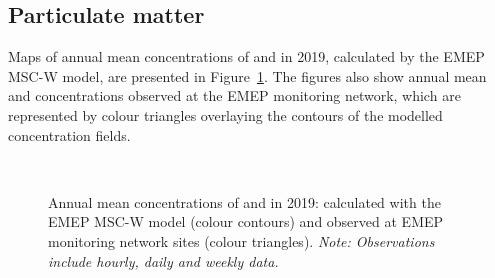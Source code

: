 \subsection{Particulate matter} 
\label{subs:PMstatus}

Maps of annual mean concentrations of \PM[10] and \PM[2.5] in 2019,
calculated by the EMEP MSC-W model, are presented in
Figure~\ref{fig:PMin2019}. The figures also show annual mean \PM[10]
and \PM[2.5] concentrations observed at the EMEP monitoring network,
which are represented by colour triangles overlaying the contours of the
modelled concentration fields.

\begin{figure}[H]
  \\
  \vspace{0.5cm}
\caption{Annual mean concentrations of \PM[10] and \PM[2.5] in 2019:
  calculated with the EMEP MSC-W model (colour contours) and observed
  at EMEP monitoring network sites (colour triangles). \textit{Note:
    Observations include hourly, daily and weekly data.}}
\label{fig:PMin2019}
\end{figure}


